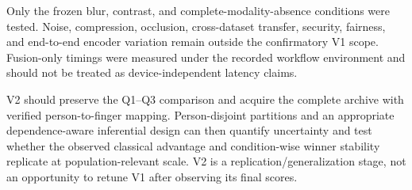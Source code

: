 Only the frozen blur, contrast, and complete-modality-absence conditions were
tested. Noise, compression, occlusion, cross-dataset transfer, security,
fairness, and end-to-end encoder variation remain outside the confirmatory V1
scope. Fusion-only timings were measured under the recorded workflow
environment and should not be treated as device-independent latency claims.

V2 should preserve the Q1--Q3 comparison and acquire the complete archive with
verified person-to-finger mapping. Person-disjoint partitions and an appropriate
dependence-aware inferential design can then quantify uncertainty and test
whether the observed classical advantage and condition-wise winner stability
replicate at population-relevant scale. V2 is a replication/generalization
stage, not an opportunity to retune V1 after observing its final scores.

